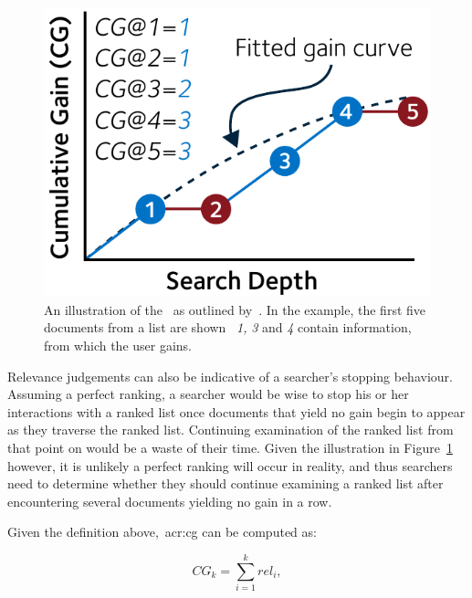 \begin{figure}
    \begin{center}
    \vspace*{-10mm}
    \includegraphics[width=1\textwidth]{figures/ch2-cg.pdf}
    \end{center}
    \vspace*{-4mm}
    \caption[Example plot of~\gls{acr:cg} accumulation]{An illustration of the~ as outlined by~\cite{jarvelin2000cg, jarvelin2002cg}. In the example, the first five documents from a list are shown \textemdash~\emph{1,} \emph{3} and \emph{4} contain information, from which the user gains.}
    \label{fig:cg}
\end{figure}

Relevance judgements can also be indicative of a searcher's stopping behaviour. Assuming a perfect ranking, a searcher would be wise to stop his or her interactions with a ranked list once documents that yield no gain begin to appear as they traverse the ranked list. Continuing examination of the ranked list from that point on would be a waste of their time. Given the illustration in Figure~\ref{fig:cg} however, it is unlikely a perfect ranking will occur in reality, and thus searchers need to determine whether they should continue examining a ranked list after encountering several documents yielding no gain in a row.

Given the definition above,~\gls{acr:cg} can be computed as:

\begin{equation}
    CG_k = \sum_{i=1}^{k} rel_i,
\end{equation}

